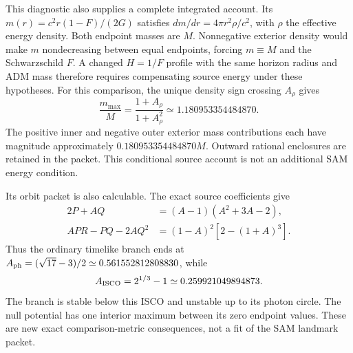 \documentclass[10pt,twocolumn,letterpaper]{article}
\begin{document}
This diagnostic also supplies a complete integrated account. Its
$m(r)=c^2r(1-F)/(2G)$ satisfies $dm/dr=4\pi r^2\rho/c^2$, with
$\rho$ the effective energy density. Both endpoint masses are $M$.
Nonnegative exterior density would make $m$ nondecreasing between equal
endpoints, forcing $m\equiv M$ and the Schwarzschild $F$. A changed
$H=1/F$ profile with the same horizon radius and ADM mass therefore
requires compensating source energy under these hypotheses. For this
comparison, the unique density sign crossing $A_\rho$ gives
\[
 \frac{m_{\max}}M=\frac{1+A_\rho}{1+A_\rho^2}
          \simeq1.180953354484870.
\]
The positive inner and negative outer exterior mass contributions each
have magnitude approximately $0.180953354484870M$. Outward rational
enclosures are retained in the packet. This conditional source account
is not an additional SAM energy condition.

Its orbit packet is also calculable. The exact source coefficients give
\begin{align}
 2P+AQ&=(A-1)(A^2+3A-2),\nonumber\\
 APR-PQ-2AQ^2&=(1-A)^2[2-(1+A)^3].
 \label{eq:ch5-degenerate-orbit-factors}
\end{align}
Thus the ordinary timelike branch ends at
$A_{\rm ph}=(\sqrt{17}-3)/2\simeq0.561552812808830$, while
\[
 A_{\rm ISCO}=2^{1/3}-1\simeq0.259921049894873.
\]
The branch is stable below this ISCO and unstable up to its photon
circle. The null potential has one interior maximum between its zero
endpoint values. These are new exact comparison-metric consequences,
not a fit of the SAM landmark packet.



\end{document}
